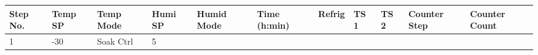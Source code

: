 \begin{longtable}[]{@{}lllllllllll@{}}
\toprule
\begin{minipage}[b]{0.08\columnwidth}\raggedright
Step No.\strut
\end{minipage} & \begin{minipage}[b]{0.07\columnwidth}\raggedright
Temp SP\strut
\end{minipage} & \begin{minipage}[b]{0.09\columnwidth}\raggedright
Temp Mode\strut
\end{minipage} & \begin{minipage}[b]{0.06\columnwidth}\raggedright
Humi SP\strut
\end{minipage} & \begin{minipage}[b]{0.06\columnwidth}\raggedright
Humid Mode\strut
\end{minipage} & \begin{minipage}[b]{0.12\columnwidth}\raggedright
Time (h:min)\strut
\end{minipage} & \begin{minipage}[b]{0.07\columnwidth}\raggedright
Refrig\strut
\end{minipage} & \begin{minipage}[b]{0.04\columnwidth}\raggedright
TS 1\strut
\end{minipage} & \begin{minipage}[b]{0.05\columnwidth}\raggedright
TS 2\strut
\end{minipage} & \begin{minipage}[b]{0.03\columnwidth}\raggedright
Counter Step\strut
\end{minipage} & \begin{minipage}[b]{0.03\columnwidth}\raggedright
Counter Count\strut
\end{minipage}\tabularnewline
\midrule
\endhead
\begin{minipage}[t]{0.08\columnwidth}\raggedright
1\strut
\end{minipage} & \begin{minipage}[t]{0.07\columnwidth}\raggedright
-30\strut
\end{minipage} & \begin{minipage}[t]{0.09\columnwidth}\raggedright
Soak Ctrl\strut
\end{minipage} & \begin{minipage}[t]{0.06\columnwidth}\raggedright
5\strut
\end{minipage} & \begin{minipage}[t]{0.06\columnwidth}\raggedright

\end{minipage}
\end{longtable}
